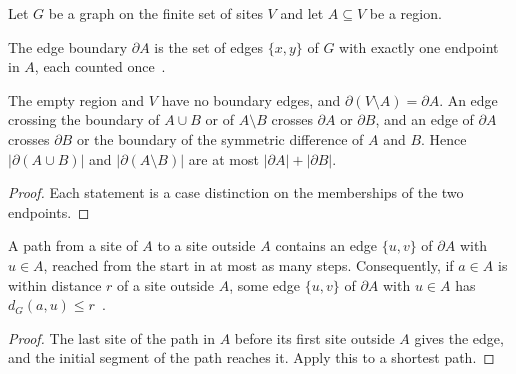 Let $G$ be a graph on the finite set of sites $V$ and let $A\subseteq V$ be a region.

\begin{definition}
    \label{def:sites_edge_boundary}
    \leanok
    The edge boundary $\partial A$ is the set of edges $\{x,y\}$ of $G$ with exactly
    one endpoint in $A$, each counted once~\cite{OpenAI2026AreaLaw}.
\end{definition}

\begin{lemma}
    \label{lem:sites_edge_boundary}
    \leanok
    The empty region and $V$ have no boundary edges, and
    $\partial(V\setminus A)=\partial A$. An edge crossing the boundary of $A\cup B$ or of
    $A\setminus B$ crosses $\partial A$ or $\partial B$, and an edge of $\partial A$
    crosses $\partial B$ or the boundary of the symmetric difference of $A$ and $B$.
    Hence $|\partial(A\cup B)|$ and $|\partial(A\setminus B)|$ are at most
    $|\partial A|+|\partial B|$.
\end{lemma}
\begin{proof}\leanok
    Each statement is a case distinction on the memberships of the two endpoints.
\end{proof}

\begin{lemma}
    \label{lem:sites_edge_boundary_walk}
    \leanok
    A path from a site of $A$ to a site outside $A$ contains an edge $\{u,v\}$ of
    $\partial A$ with $u\in A$, reached from the start in at most as many steps.
    Consequently, if $a\in A$ is within distance $r$ of a site outside $A$, some edge
    $\{u,v\}$ of $\partial A$ with $u\in A$ has $d_G(a,u)\le r$~\cite{OpenAI2026AreaLaw}.
\end{lemma}
\begin{proof}\leanok
    The last site of the path in $A$ before its first site outside $A$ gives the edge,
    and the initial segment of the path reaches it. Apply this to a shortest path.
\end{proof}

